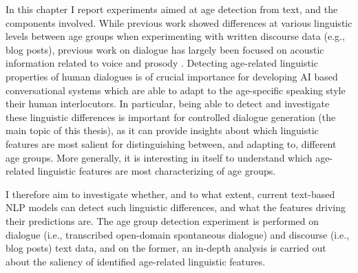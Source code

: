 
In this chapter I report experiments aimed at age detection from text, and the components involved. 
While previous work showed differences at various linguistic levels between age groups when experimenting with written discourse data (e.g., blog posts), previous work on dialogue has largely been focused on acoustic information related to voice and prosody \citep{wolters2009age, li2013automatic}.
Detecting age-related linguistic properties of human dialogues is of crucial importance for developing AI based conversational systems which are able to adapt to the age-specific speaking style their human interlocutors. In particular, being able to detect and investigate these linguistic differences is important for controlled dialogue generation (the main topic of this thesis), as it can provide insights about which linguistic features are most salient for distinguishing between, and adapting to, different age groups. More generally, it is interesting in itself to understand which age-related linguistic features are most characterizing of age groups. 

I therefore aim to investigate whether, and to what extent, current text-based NLP models can detect such linguistic differences, and what the features driving their predictions are. The age group detection experiment is performed on dialogue (i.e., transcribed open-domain spontaneous dialogue) and discourse (i.e., blog posts) text data, and on the former, an in-depth analysis is carried out about the saliency of identified age-related linguistic features.


